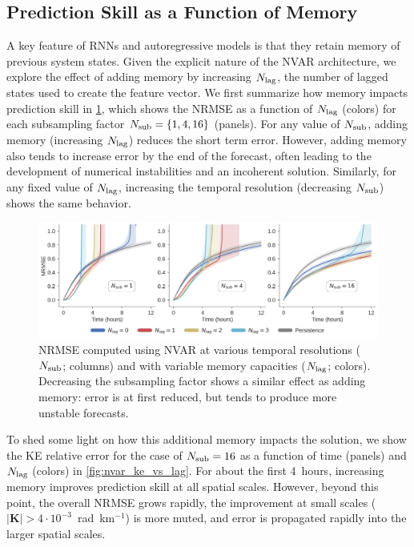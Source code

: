 \documentclass[draft]{agujournal2019}
\begin{document}
\subsection{Prediction Skill as a Function of Memory}
\label{subsec:nvar-memory}

A key feature of RNNs and autoregressive models is that they retain memory of
previous system states.
Given the explicit nature of the NVAR architecture, we explore the effect of
adding memory by increasing $N_\text{lag}$, the number of lagged states used to create the
feature vector.
We first summarize how memory impacts prediction skill in
\cref{fig:nvar_nrmse_vs_lag}, which shows the NRMSE as a
function of $N_\text{lag}$ (colors) for each
subsampling factor $N_\text{sub} = \{1, 4, 16\}$ (panels).
For any value of $N_\text{sub}$, adding memory (increasing $N_\text{lag}$) reduces
the short term error.
However, adding memory also tends to increase error by the end of the forecast,
often leading to the development of numerical instabilities and an
incoherent solution.
Similarly, for any fixed value of $N_\text{lag}$, increasing the temporal resolution
(decreasing $N_\text{sub}$) shows the same behavior.

\begin{figure}
    \centering
    \includegraphics[width=\textwidth]{figures/nvar_nrmse_vs_memory.jpg}
    \caption{NRMSE computed using NVAR at various temporal resolutions
        ($N_\text{sub}$; columns) and with variable memory capacities ($N_\text{lag}$;
        colors).
        Decreasing the subsampling factor shows a similar effect as adding
        memory: error is at first reduced, but tends to produce more unstable
        forecasts.
    }
    \label{fig:nvar_nrmse_vs_lag}
\end{figure}

To shed some light on how this additional memory impacts the solution,
we show the KE relative error
for the case of $N_\text{sub}=16$ as a function of time (panels) and $N_\text{lag}$ (colors)
in \cref{fig:nvar_ke_vs_lag}.
For about the first 4~hours, increasing memory improves prediction skill at all
spatial scales.
However, beyond this point, the overall NRMSE grows rapidly, the improvement
at small scales ($|\mathbf{K}|>4\cdot10^{-3}$~rad~km$^{-1}$) is more muted,
and error is propagated rapidly into the larger spatial scales.
\end{document}
